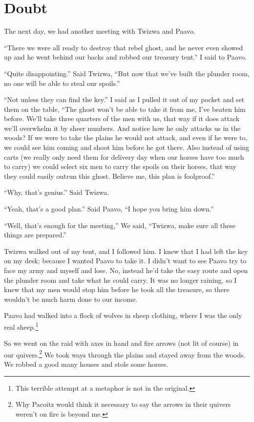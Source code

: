 \chapter{Doubt}

The next day, we had another meeting with Twi\-zwa and Paa\-vo.

``There we were all ready to destroy that rebel ghost, and he never even showed up and he went behind our backs and robbed our treasury tent.'' I said to Paa\-vo.

``Quite disappointing.'' Said Twi\-zwa, ``But now that we've built the plunder room, no one will be able to steal our spoils.''

``Not unless they can find the key.'' I said as I pulled it out of my pocket and set them on the table, ``The ghost won't be able to take it from me, I've beaten him before. We'll take three quarters of the men with us, that way if it does attack we'll overwhelm it by sheer numbers. And notice how he only attacks us in the woods? If we were to take the plains he would not attack, and even if he were to, we could see him coming and shoot him before he got there. Also instead of using carts (we really only need them for delivery day when our horses have too much to carry) we could select six men to carry the spoils on their horses, that way they could easily outrun this ghost. Believe me, this plan is foolproof.''

``Why, that's genius.'' Said Twi\-zwa.

``Yeah, that's a good plan.'' Said Paa\-vo, ``I hope you bring him down.''

``Well, that's enough for the meeting,'' We said, ``Twi\-zwa, make sure all these things are prepared.''

Twi\-zwa walked out of my tent, and I followed him. I knew that I had left the key on my desk; because I wanted Paa\-vo to take it. I didn't want to see Paa\-vo try to face my army and myself and lose. No, instead he'd take the easy route and open the plunder room and take what he could carry. It was no longer raining, so I knew that my men would stop him before he took all the treasure, so there wouldn't be much harm done to our income.

Paa\-vo had walked into a flock of wolves in sheep clothing, where I was the only real sheep.\footnote{This terrible attempt at a metaphor is not in the original.} 

So we went on the raid with axes in hand and fire arrows (not lit of course) in our quivers.\footnote{Why Pa\-co\-itz would think it necessary to say the arrows in their quivers weren't on fire is beyond me.} We took ways through the plains and stayed away from the woods. We robbed a good many houses and stole some horses.

